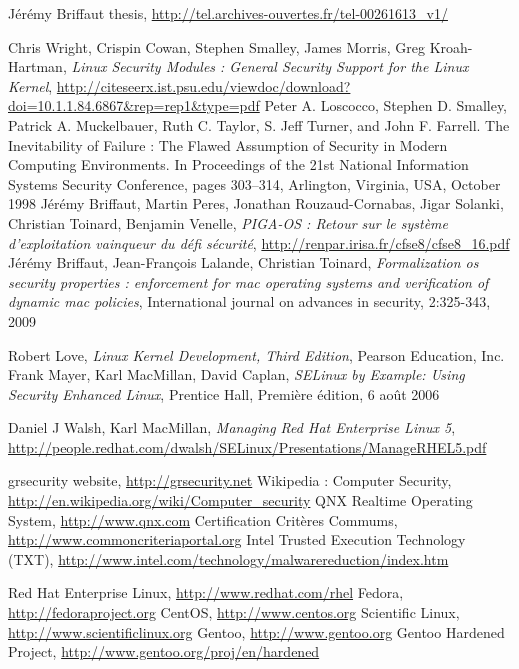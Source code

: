 \documentclass[pdftex,a4paper,titlepage,11pt]{article}
\begin{document}
\begin{thebibliography}{40}

 Jérémy Briffaut thesis, \url{http://tel.archives-ouvertes.fr/tel-00261613_v1/}

 Chris Wright, Crispin Cowan, Stephen Smalley, James Morris, Greg Kroah-Hartman, \textit{Linux Security Modules : General Security Support for the Linux Kernel}, \url{http://citeseerx.ist.psu.edu/viewdoc/download?doi=10.1.1.84.6867&rep=rep1&type=pdf}
 Peter A. Loscocco, Stephen D. Smalley, Patrick A. Muckelbauer, Ruth C. Taylor, S. Jeff Turner, and John F. Farrell. The Inevitability of Failure : The Flawed Assumption of Security in Modern Computing Environments. In Proceedings of the 21st National Information Systems Security Conference, pages 303–314, Arlington, Virginia, USA, October 1998
 Jérémy Briffaut, Martin Peres, Jonathan Rouzaud-Cornabas, Jigar Solanki, Christian Toinard, Benjamin Venelle, \textit{PIGA-OS : Retour sur le système d'exploitation vainqueur du défi sécurité}, \url{http://renpar.irisa.fr/cfse8/cfse8_16.pdf}
 Jérémy Briffaut, Jean-François Lalande, Christian Toinard, \textit{Formalization os security properties : enforcement for mac operating systems and verification of dynamic mac policies}, International journal on advances in security, 2:325-343, 2009

 Robert Love, \textit{Linux Kernel Development, Third Edition}, Pearson Education, Inc.
 Frank Mayer, Karl MacMillan, David Caplan, \textit{SELinux by Example: Using Security Enhanced Linux}, Prentice Hall, Première édition, 6 août 2006

 Daniel J Walsh, Karl MacMillan, \textit{Managing Red Hat Enterprise Linux 5}, \url{http://people.redhat.com/dwalsh/SELinux/Presentations/ManageRHEL5.pdf}

 grsecurity website, \url{http://grsecurity.net}
 Wikipedia : Computer Security, \url{http://en.wikipedia.org/wiki/Computer_security}
 QNX Realtime Operating System, \url{http://www.qnx.com}
 Certification Critères Commums, \url{http://www.commoncriteriaportal.org}
 Intel Trusted Execution Technology (TXT), \url{http://www.intel.com/technology/malwarereduction/index.htm}

 Red Hat Enterprise Linux, \url{http://www.redhat.com/rhel}
 Fedora, \url{http://fedoraproject.org}
 CentOS, \url{http://www.centos.org}
 Scientific Linux, \url{http://www.scientificlinux.org}
 Gentoo, \url{http://www.gentoo.org}
 Gentoo Hardened Project, \url{http://www.gentoo.org/proj/en/hardened}

\end{thebibliography}
\end{document}
